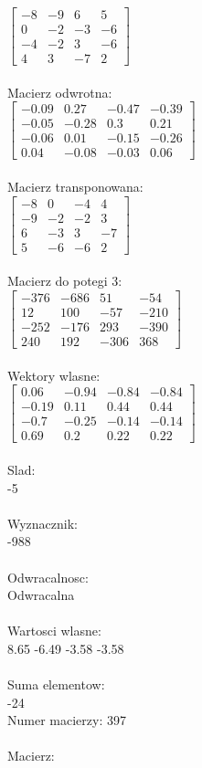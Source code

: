\documentclass[a4paper,12pt]{article}
\begin{document}
$\begin{bmatrix} -8&-9&6&5\\0&-2&-3&-6\\-4&-2&3&-6\\4&3&-7&2 \end{bmatrix}$
\\
\\
Macierz odwrotna:\\

$\begin{bmatrix} -0.09&0.27&-0.47&-0.39\\-0.05&-0.28&0.3&0.21\\-0.06&0.01&-0.15&-0.26\\0.04&-0.08&-0.03&0.06 \end{bmatrix}$
\\
\\
Macierz transponowana:\\

$\begin{bmatrix} -8&0&-4&4\\-9&-2&-2&3\\6&-3&3&-7\\5&-6&-6&2 \end{bmatrix}$
\\
\\
Macierz do potegi 3:\\

$\begin{bmatrix} -376&-686&51&-54\\12&100&-57&-210\\-252&-176&293&-390\\240&192&-306&368 \end{bmatrix}$
\\
\\
Wektory wlasne:\\

$\begin{bmatrix} 0.06&-0.94&-0.84&-0.84\\-0.19&0.11&0.44&0.44\\-0.7&-0.25&-0.14&-0.14\\0.69&0.2&0.22&0.22 \end{bmatrix}$
\\
\\
Slad:\\
-5
\\
\\
Wyznacznik:\\
-988
\\
\\
Odwracalnosc:\\
Odwracalna
\\
\\
Wartosci wlasne:\\
8.65 -6.49 -3.58 -3.58
\\
\\
Suma elementow:\\
-24
\\
\newpage
Numer macierzy:
397
\\
\\
Macierz:\\
\end{document}
